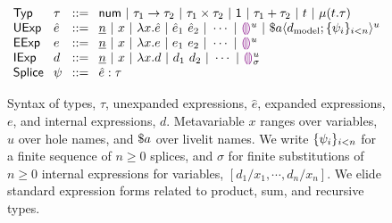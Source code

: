 \begin{figure}
    \[
    \arraycolsep=4pt\begin{array}{llcl}
        \mathsf{Typ} & \tau & ::= & 
                                    \tnum ~\vert~
                                    \tarr{\tau_1}{\tau_2} ~\vert~ 
                                    \tprod{\tau_1}{\tau_2} ~\vert~ 
                                    \tunit ~\vert~ 
                                    \tsum{\tau_1}{\tau_2} ~\vert~
                                    t ~\vert~
                                    \trec{t}{\tau}\\
        \mathsf{UExp} & \hat{e} & ::= & \hnum{n} ~\vert~ 
                                 x ~\vert~
                                 \hlam{x}{\hat e} ~\vert~
                                 \hap{\hat e_1}{\hat e_2} ~\vert~
                                 \cdots ~\vert~
                                 \hehole{u} ~\vert~
                                 \haplivelit{u}{a}{\dtxt{model}}{\splices}\\
        \mathsf{EExp} & e & ::= & \hnum{n} ~\vert~ x ~\vert~ \hlam{x}{e} ~\vert~ \hap{e_1}{e_2} ~\vert~ \cdots ~\vert~ \hehole{u}\\
        \mathsf{IExp} & d & ::= & \hnum{n} ~\vert~ x ~\vert~ \hlam{x}{d} ~\vert~ \hap{d_1}{d_2} ~\vert~ \cdots ~\vert~ \dehole{u}{\sigma}\\
        \mathsf{Splice} & \psi & ::= & \hsplice{\hat e}{\tau}
    \end{array}
    \]
    \caption{Syntax of types, $\tau$, unexpanded expressions, $\hat{e}$, expanded expressions, $e$, and internal expressions, $d$. 
    Metavariable $x$ ranges over variables, $u$ over hole names, and $\$a$ over livelit names.
    We write $\{\psi_i\}_{i < n}$ for a finite sequence of $n \geq 0$ splices,
    and $\sigma$ for finite substitutions of $n \geq 0$ internal expressions for variables, $[d_1/x_1, \cdots, d_n/x_n]$. 
    We elide standard expression forms 
    related to product, sum, and recursive types.
    }
    \label{fig:syntax}
    \end{figure}
    
